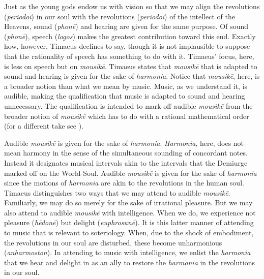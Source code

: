 Just as the young gods endow us with vision so that we may align the revolutions (\emph{periodoi}) in our soul with the revolutions (\emph{periodoi}) of the intellect of the Heavens, sound (\emph{phonē}) and hearing are given for the same purpose. Of sound (\emph{phonē}), speech (\emph{logos}) makes the greatest contribution toward this end. Exactly how, however, Timaeus declines to say, though it is not implausible to suppose that the rationality of speech has something to do with it. Timaeus' focus, here, is less on speech but on \emph{mousikē}. Timaeus states that \emph{mousikē} that is adapted to sound and hearing is given for the sake of \emph{harmonia}. Notice that \emph{mousikē}, here, is a broader notion than what we mean by music. Music, as we understand it, is audible, making the qualification that music is adapted to sound and hearing unnecessary. The qualification is intended to mark off audible \emph{mousikē} from the broader notion of \emph{mousikē} which has to do with a rational mathematical order (for a different take see \citealt[295--6]{Taylor:1928qb}). 

Audible \emph{mousikē} is given for the sake of \emph{harmonia}. \emph{Harmonia}, here, does not mean harmony in the sense of the simultaneous sounding of concordant notes. Instead it designates musical intervals akin to the intervals that the Demiurge marked off on the World-Soul. Audible \emph{mousikē} is given for the sake of \emph{harmonia} since the motions of \emph{harmonia} are akin to the revolutions in the human soul. Timaeus distinguishes two ways that we may attend to audible \emph{mousikē}. Familiarly, we may do so merely for the sake of irrational pleasure. But we may also attend to audible \emph{mousikē} with intelligence. When we do, we experience not pleasure (\emph{hēdonē}) but delight (\emph{euphrosunē}). It is this latter manner of attending to music that is relevant to soteriology. When, due to the shock of embodiment, the revolutions in our soul are disturbed, these become unharmonious (\emph{anharmoston}). In attending to music with intelligence, we enlist the \emph{harmonia} that we hear and delight in as an ally to restore the \emph{harmonia} in the revolutions in our soul.

